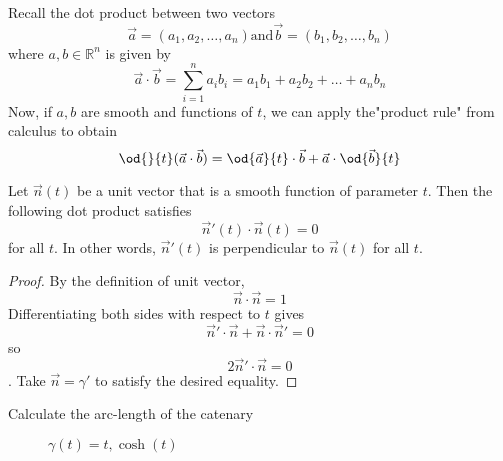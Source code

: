     Recall the dot product between two vectors
        \[
\vec{a} = (a_{1}, a_{2}, \ldots, a_{n}) \text{and} \vec{b} = (b_{1}, b_{2}, \ldots, b_{n})
\]
    where \(a, b \in \mathbb{R}^{n}\) is given by
        \[
\vec{a} \cdot \vec{b} = \sum_{i = 1}^{n} a_{i}b_{i} = a_{1}b_{1} + a_{2}b_{2} + \ldots + a_{n}b_{n}
\]
    Now, if \(a,b\) are smooth and functions of \(t\), we can apply the"product rule" from calculus to obtain
        \[
\od{}{t}(\vec{a} \cdot \vec{b}) = \od{\vec{a}}{t} \cdot \vec{b} + \vec{a} \cdot \od{\vec{b}}{t}
\]

    \begin{proposition}
        Let \(\vec{n}(t)\) be a unit vector that is a smooth function of parameter \(t\). Then the following dot product satisfies
            \[
\vec{n}'(t) \cdot \vec{n}(t) = 0
\]
        for all \(t\). In other words, \(\vec{n}'(t)\) is perpendicular to \(\vec{n}(t)\) for all \(t\).
        \begin{proof}
            By the definition of unit vector,
                \[
\vec{n} \cdot \vec{n} = 1
\]
            Differentiating both sides with respect to \(t\) gives
                \[
\vec{n}' \cdot \vec{n} + \vec{n} \cdot \vec{n}' = 0
\]
            so
                \[
2 \vec{n}' \cdot \vec{n} = 0
\]
. Take \(\vec{n} = \gamma'\) to satisfy the desired equality.
        \end{proof}
    \end{proposition}

   \begin{problem}
        Calculate the arc-length of the catenary
        \begin{figure}[h]
            \centering
            \caption*{\(\gamma(t) = t, \cosh(t)\)}
        \end{figure}
    \end{problem}

